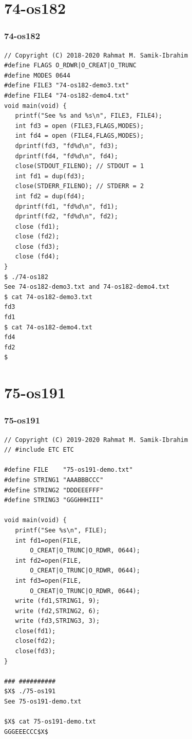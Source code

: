 \documentclass[aspectratio=169, xcolor=table, notheorems, hyperref={pdfpagelabels=false}]{beamer}
\begin{document}
\section{74-os182}
\begin{frame}[fragile]
\frametitle{74-os182}
\begin{lstlisting}[basicstyle=\ttfamily\tiny]
// Copyright (C) 2018-2020 Rahmat M. Samik-Ibrahim
#define FLAGS O_RDWR|O_CREAT|O_TRUNC
#define MODES 0644
#define FILE3 "74-os182-demo3.txt"
#define FILE4 "74-os182-demo4.txt"
void main(void) {
   printf("See %s and %s\n", FILE3, FILE4);
   int fd3 = open (FILE3,FLAGS,MODES);
   int fd4 = open (FILE4,FLAGS,MODES);
   dprintf(fd3, "fd%d\n", fd3);
   dprintf(fd4, "fd%d\n", fd4);
   close(STDOUT_FILENO); // STDOUT = 1
   int fd1 = dup(fd3);
   close(STDERR_FILENO); // STDERR = 2
   int fd2 = dup(fd4);
   dprintf(fd1, "fd%d\n", fd1);
   dprintf(fd2, "fd%d\n", fd2);
   close (fd1);
   close (fd2);
   close (fd3);
   close (fd4);
}
$ ./74-os182 
See 74-os182-demo3.txt and 74-os182-demo4.txt
$ cat 74-os182-demo3.txt 
fd3
fd1
$ cat 74-os182-demo4.txt 
fd4
fd2
$ 

\end{lstlisting}
\end{frame}

\section{75-os191}
\begin{frame}[fragile]
\frametitle{75-os191}
\begin{lstlisting}[basicstyle=\ttfamily\tiny]
// Copyright (C) 2019-2020 Rahmat M. Samik-Ibrahim
// #include ETC ETC

#define FILE    "75-os191-demo.txt"
#define STRING1 "AAABBBCCC"
#define STRING2 "DDDEEEFFF"
#define STRING3 "GGGHHHIII"

void main(void) {
   printf("See %s\n", FILE);
   int fd1=open(FILE, 
       O_CREAT|O_TRUNC|O_RDWR, 0644);
   int fd2=open(FILE, 
       O_CREAT|O_TRUNC|O_RDWR, 0644);
   int fd3=open(FILE, 
       O_CREAT|O_TRUNC|O_RDWR, 0644);
   write (fd1,STRING1, 9);
   write (fd2,STRING2, 6);
   write (fd3,STRING3, 3);
   close(fd1);
   close(fd2);
   close(fd3);
}

### ##########
$X$ ./75-os191 
See 75-os191-demo.txt

$X$ cat 75-os191-demo.txt 
GGGEEECCC$X$

\end{lstlisting}
\end{frame}
\end{document}
